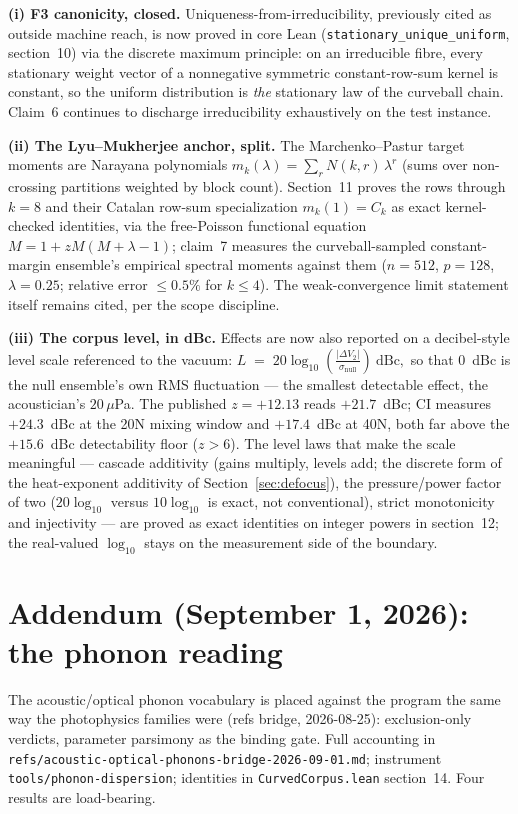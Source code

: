 \documentclass[11pt,a4paper]{article}
\theoremstyle{plain}
\theoremstyle{remark}
\begin{document}
\textbf{(i) F3 canonicity, closed.} Uniqueness-from-irreducibility, previously cited as outside machine reach, is now proved in core Lean (\texttt{stationary\_unique\_uniform}, section~10) via the discrete maximum principle: on an irreducible fibre, every stationary weight vector of a nonnegative symmetric constant-row-sum kernel is constant, so the uniform distribution is \emph{the} stationary law of the curveball chain. Claim~6 continues to discharge irreducibility exhaustively on the test instance.

\textbf{(ii) The Lyu--Mukherjee anchor, split.} The Marchenko--Pastur target moments are Narayana polynomials $m_k(\lambda)=\sum_r N(k,r)\,\lambda^r$ (sums over non-crossing partitions weighted by block count). Section~11 proves the rows through $k=8$ and their Catalan row-sum specialization $m_k(1)=C_k$ as exact kernel-checked identities, via the free-Poisson functional equation $M = 1 + zM(M+\lambda-1)$; claim~7 measures the curveball-sampled constant-margin ensemble's empirical spectral moments against them ($n{=}512$, $p{=}128$, $\lambda{=}0.25$; relative error $\le 0.5\%$ for $k\le4$). The weak-convergence limit statement itself remains cited, per the scope discipline.

\textbf{(iii) The corpus level, in dBc.} Effects are now also reported on a decibel-style level scale referenced to the vacuum:
$L \;=\; 20\log_{10}\!\left(\frac{|\Delta V_2|}{\sigma_{\mathrm{null}}}\right)\ \text{dBc},$
so that $0$~dBc is the null ensemble's own RMS fluctuation --- the smallest detectable effect, the acoustician's $20\,\mu$Pa. The published $z=+12.13$ reads $+21.7$~dBc; CI measures $+24.3$~dBc at the 20N mixing window and $+17.4$~dBc at 40N, both far above the $+15.6$~dBc detectability floor ($z>6$). The level laws that make the scale meaningful --- cascade additivity (gains multiply, levels add; the discrete form of the heat-exponent additivity of Section~\ref{sec:defocus}), the pressure/power factor of two ($20\log_{10}$ versus $10\log_{10}$ is exact, not conventional), strict monotonicity and injectivity --- are proved as exact identities on integer powers in section~12; the real-valued $\log_{10}$ stays on the measurement side of the boundary.

\section{Addendum (September 1, 2026): the phonon reading}
\label{sec:phonons}
The acoustic/optical phonon vocabulary is placed against the program the same way the photophysics families were (refs bridge, 2026-08-25): exclusion-only verdicts, parameter parsimony as the binding gate. Full accounting in \texttt{refs/acoustic-optical-phonons-bridge-2026-09-01.md}; instrument \texttt{tools/phonon-dispersion}; identities in \texttt{CurvedCorpus.lean} section~14. Four results are load-bearing.
\end{document}
